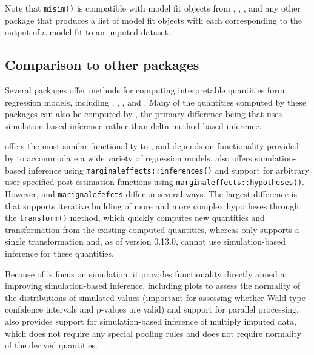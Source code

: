 Note that \texttt{misim()} is compatible with model fit objects from , , , and any other package that produces a list of model fit objects with each corresponding to the output of a model fit to an imputed dataset.

\hypertarget{comparison-to-other-packages}{%
\subsection{Comparison to other packages}\label{comparison-to-other-packages}}

Several packages offer methods for computing interpretable quantities form regression models, including , , , and . Many of the quantities computed by these packages can also be computed by , the primary difference being that  uses simulation-based inference rather than delta method-based inference.

 offers the most similar functionality to , and  depends on functionality provided by  to accommodate a wide variety of regression models.  also offers simulation-based inference using \texttt{marginaleffects::inferences()} and support for arbitrary user-specified post-estimation functions using \texttt{marginaleffects::hypotheses()}. However,  and \texttt{marignalefefcts} differ in several ways. The largest difference is that  supports iterative building of more and more complex hypotheses through the \texttt{transform()} method, which quickly computes new quantities and transformation from the existing computed quantities, whereas  only supports a single transformation and, as of version 0.13.0, cannot use simulation-based inference for these quantities.

Because of 's focus on simulation, it provides functionality directly aimed at improving simulation-based inference, including plots to assess the normality of the distributions of simulated values (important for assessing whether Wald-type confidence intervals and p-values are valid) and support for parallel processing.  also provides support for simulation-based inference of multiply imputed data, which does not require any special pooling rules and does not require normality of the derived quantities.

